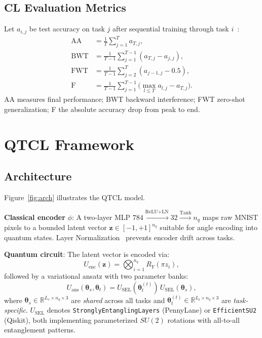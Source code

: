 \documentclass[a4paper,nopdfoutputerror]{quantumarticle}
\begin{document}
\subsection{CL Evaluation Metrics}

Let $a_{i,j}$ be test accuracy on task $j$ after sequential training
through task $i$~\cite{lopez2017gradient}:
\begin{align}
  \mathrm{AA}  &= \tfrac{1}{T}\textstyle\sum_{j=1}^{T} a_{T,j},
  \label{eq:aa}\\
  \mathrm{BWT} &= \tfrac{1}{T-1}\textstyle\sum_{j=1}^{T-1}(a_{T,j}-a_{j,j}),
  \label{eq:bwt}\\
  \mathrm{FWT} &= \tfrac{1}{T-1}\textstyle\sum_{j=2}^{T}(a_{j-1,j}-0.5),
  \label{eq:fwt}\\
  \mathrm{F}   &= \tfrac{1}{T-1}\textstyle\sum_{j=1}^{T-1}
                  \bigl(\max_{l\leq T} a_{l,j} - a_{T,j}\bigr).
  \label{eq:forg}
\end{align}
AA measures final performance; BWT backward interference; FWT zero-shot
generalization; F the absolute accuracy drop from peak to end.


\section{QTCL Framework}
\label{sec:method}

\subsection{Architecture}

Figure~\ref{fig:arch} illustrates the QTCL model.

\textbf{Classical encoder} $\phi$:
A two-layer MLP $784\xrightarrow{\text{ReLU}+\text{LN}}32\xrightarrow{\text{Tanh}}n_q$
maps raw MNIST pixels to a bounded latent vector $\mathbf{z}\in[-1,+1]^{n_q}$
suitable for angle encoding into quantum states.
Layer Normalization~\cite{ba2016layer} prevents encoder drift across tasks.

\textbf{Quantum circuit}:
The latent vector is encoded via:
\begin{equation}
  U_\mathrm{enc}(\mathbf{z}) = \bigotimes_{i=1}^{n_q} R_Y(\pi z_i),
\end{equation}
followed by a variational ansatz with two parameter banks:
\begin{equation}
  U_\mathrm{ans}(\boldsymbol\theta_s, \boldsymbol\theta_t) =
  U_\mathrm{SEL}(\boldsymbol\theta_t^{(t)})\,
  U_\mathrm{SEL}(\boldsymbol\theta_s),
\end{equation}
where $\boldsymbol\theta_s\in\mathbb{R}^{L_s \times n_q \times 3}$ are
\emph{shared} across all tasks and $\boldsymbol\theta_t^{(t)}\in\mathbb{R}^{L_t \times n_q \times 3}$
are \emph{task-specific}.
$U_\mathrm{SEL}$ denotes \texttt{StronglyEntanglingLayers} (PennyLane) or
\texttt{EfficientSU2} (Qiskit), both implementing parameterized $SU(2)$ rotations
with all-to-all entanglement patterns.
\end{document}
